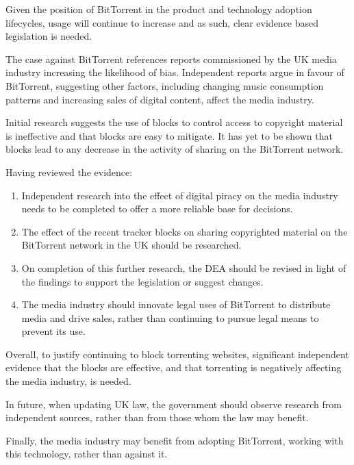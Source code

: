 
Given the position of BitTorrent in the product and technology adoption lifecycles, usage will continue to increase and as such, clear evidence based legislation is needed.

The case against BitTorrent references reports commissioned by the UK media industry increasing the likelihood of bias. Independent reports argue in favour of BitTorrent, suggesting other factors, including changing music consumption patterns and increasing sales of digital content, affect the media industry.

Initial research suggests the use of blocks to control access to copyright material is ineffective and that blocks are easy to mitigate. It has yet to be shown that blocks lead to any decrease in the activity of sharing on the BitTorrent network.

Having reviewed the evidence:
\begin{enumerate}
\item Independent research into the effect of digital piracy on the media industry needs to be completed to offer a more reliable base for decisions.
\item The effect of the recent tracker blocks on sharing copyrighted material on the BitTorrent network in the UK should be researched.
\item On completion of this further research, the DEA should be revised in light of the findings to support the legislation or suggest changes.
\item The media industry should innovate legal uses of BitTorrent to distribute media and drive sales, rather than continuing to pursue legal means to prevent its use. %
\end{enumerate}
 
Overall, to justify continuing to block torrenting websites, significant independent evidence that the blocks are effective, and that torrenting is negatively affecting the media industry, is needed. 

In future, when updating UK law, the government should observe research from independent sources, rather than from those whom the law may benefit.

Finally, the media industry may benefit from adopting BitTorrent, working with this technology, rather than against it.
